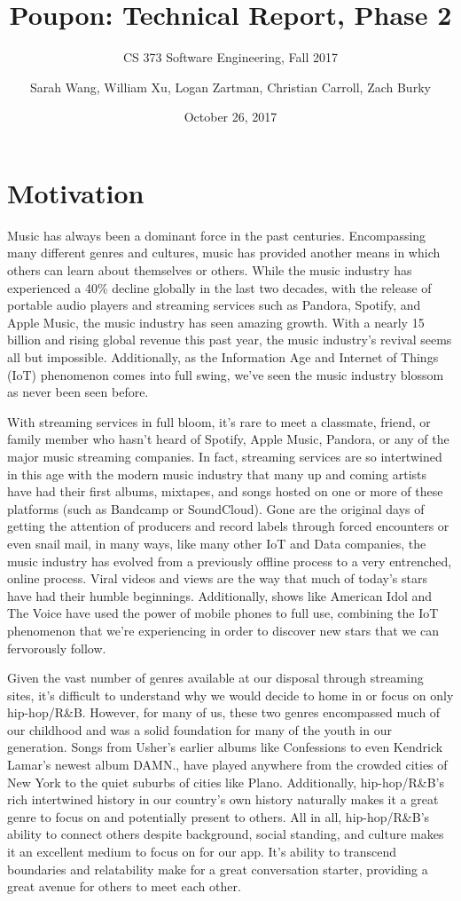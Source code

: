 \documentclass{scrartcl}
\title{Poupon: Technical Report, Phase 2}
\subtitle{CS 373 Software Engineering, Fall 2017}
\author{Sarah Wang, William Xu, Logan Zartman, Christian Carroll, Zach Burky}
\date{October 26, 2017}
\begin{document}
\maketitle

\tableofcontents

\newpage
\section{Motivation}
\indent
Music has always been a dominant force in the past centuries. Encompassing many different genres and cultures, music has provided another means in which others can learn about themselves or others. While the music industry has experienced a 40\% decline globally in the last two decades, with the release of portable audio players and streaming services such as Pandora, Spotify, and Apple Music, the music industry has seen amazing growth. With a nearly 15 billion and rising global revenue this past year, the music industry’s revival seems all but impossible. Additionally, as the Information Age and Internet of Things (IoT) phenomenon comes into full swing, we’ve seen the music industry blossom as never been seen before.

With streaming services in full bloom, it’s rare to meet a classmate, friend, or family member who hasn’t heard of Spotify, Apple Music, Pandora, or any of the major music streaming companies. In fact, streaming services are so intertwined in this age with the modern music industry that many up and coming artists have had their first albums, mixtapes, and songs hosted on one or more of these platforms (such as Bandcamp or SoundCloud). Gone are the original days of getting the attention of producers and record labels through forced encounters or even snail mail, in many ways, like many other IoT and Data companies, the music industry has evolved from a previously offline process to a very entrenched, online process. Viral videos and views are the way that much of today’s stars have had their humble beginnings. Additionally, shows like American Idol and The Voice have used the power of mobile phones to full use, combining the IoT phenomenon that we're experiencing in order to discover new stars that we can fervorously follow.

Given the vast number of genres available at our disposal through streaming sites, it’s difficult to understand why we would decide to home in or focus on only hip-hop/R\&B. However, for many of us, these two genres encompassed much of our childhood and was a solid foundation for many of the youth in our generation. Songs from Usher’s earlier albums like Confessions to even Kendrick Lamar’s newest album DAMN., have played anywhere from the crowded cities of New York to the quiet suburbs of cities like Plano. Additionally, hip-hop/R\&B’s rich intertwined history in our country’s own history naturally makes it a great genre to focus on and potentially present to others. All in all, hip-hop/R\&B’s ability to connect others despite background, social standing, and culture makes it an excellent medium to focus on for our app. It’s ability to transcend boundaries and relatability make for a great conversation starter, providing a great avenue for others to meet each other.
\end{document}

